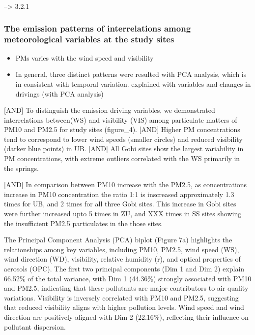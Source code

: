 \documentclass[
  11pt,
]{article}
\providecommand{\tightlist}{%
  \setlength{\itemsep}{0pt}\setlength{\parskip}{0pt}}
\begin{document}
--\textgreater{} 3.2.1

\subsubsection{The emission patterns of interrelations among
meteorological variables at the study
sites}\label{the-emission-patterns-of-interrelations-among-meteorological-variables-at-the-study-sites}

\begin{itemize}
\tightlist
\item
  PMs varies with the wind speed and visibility
\item
  In general, three distinct patterns were resulted with PCA analysis,
  which is in consistent with temporal variation. explained with
  variables and changes in drivings (with PCA analysis)
\end{itemize}

{[}AND{]} To distinguish the emission driving variables, we demonstrated
interrelations between(WS) and visibility (VIS) among particulate
matters of PM10 and PM2.5 for study sites (figure\_4). {[}AND{]} Higher
PM concentrations tend to correspond to lower wind speeds (smaller
circles) and reduced visibility (darker blue points) in UB. {[}AND{]}
All Gobi sites show the largest variability in PM concentrations, with
extreme outliers correlated with the WS primarily in the springs.

{[}AND{]} In comparison between PM10 increase with the PM2.5, as
concentrations increase in PM10 concentration the ratio 1:1 is
inscreased approximately 1.3 times for UB, and 2 times for all three
Gobi sites. This increase in Gobi sites were further increased upto 5
times in ZU, and XXX times in SS sites showing the insufficient PM2.5
particulates in the those sites.

The Principal Component Analysis (PCA) biplot (Figure 7a) highlights the
relationships among key variables, including PM10, PM2.5, wind speed
(WS), wind direction (WD), visibility, relative humidity (r), and
optical properties of aerosols (OPC). The first two principal components
(Dim 1 and Dim 2) explain 66.52\% of the total variance, with Dim 1
(44.36\%) strongly associated with PM10 and PM2.5, indicating that these
pollutants are major contributors to air quality variations. Visibility
is inversely correlated with PM10 and PM2.5, suggesting that reduced
visibility aligns with higher pollution levels. Wind speed and wind
direction are positively aligned with Dim 2 (22.16\%), reflecting their
influence on pollutant dispersion.
\end{document}
